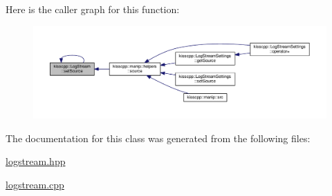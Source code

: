 Here is the caller graph for this function\-:\nopagebreak
\begin{figure}[H]
\begin{center}
\leavevmode
\includegraphics[width=350pt]{a00031_ad30c66fcfcaebbc51bb9abf2c31e4cae_icgraph}
\end{center}
\end{figure}




The documentation for this class was generated from the following files\-:\begin{DoxyCompactItemize}
\item 
\hyperlink{a00067}{logstream.\-hpp}\item 
\hyperlink{a00066}{logstream.\-cpp}\end{DoxyCompactItemize}
